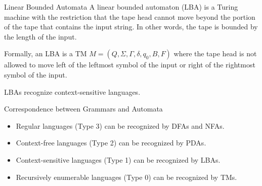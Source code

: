 \documentclass{beamer}
\begin{document}
\begin{frame}{Linear Bounded Automata}
    A linear bounded automaton (LBA) is a Turing machine with the restriction that the tape head cannot move beyond the portion of the tape that contains the input string. In other words, the tape is bounded by the length of the input.
    
    Formally, an LBA is a TM $M=(Q,\Sigma,\Gamma,\delta,q_0,B,F)$ where the tape head is not allowed to move left of the leftmost symbol of the input or right of the rightmost symbol of the input.
    
    LBAs recognize context-sensitive languages.
\end{frame}

\begin{frame}{Correspondence between Grammars and Automata}
    \begin{itemize}
        \item Regular languages (Type 3) can be recognized by DFAs and NFAs.
        \item Context-free languages (Type 2) can be recognized by PDAs.
        \item Context-sensitive languages (Type 1) can be recognized by LBAs.
        \item Recursively enumerable languages (Type 0) can be recognized by TMs.
    \end{itemize}
\end{frame}


\end{document}
